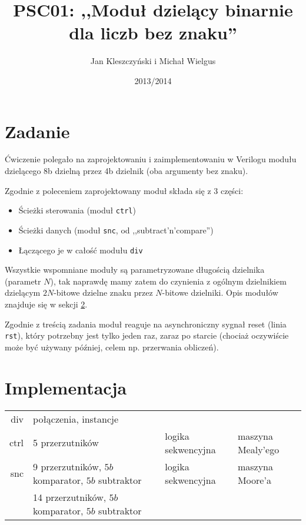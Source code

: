 \documentclass[a4paper]{article}
\author{Jan Kleszczyński i Michał Wielgus}
\title{PSC01: ,,Moduł dzielący binarnie dla liczb bez znaku''}
\date{2013/2014}
\begin{document}
\maketitle
\tableofcontents
\listoffigures
\listoftables
\clearpage
\setcounter{page}{1} 
\section{Zadanie}
Ćwiczenie polegało na zaprojektowaniu i zaimplementowaniu w Verilogu modułu dzielącego 8b dzielną przez 4b dzielnik (oba argumenty bez znaku).

Zgodnie z poleceniem zaprojektowany moduł składa się z 3 części:
\begin{itemize}
\item Ścieżki sterowania (moduł \texttt{ctrl})
\item Ścieżki danych (moduł \texttt{snc}, od ,,subtract'n'compare'')
\item Łączącego je w całość modułu \texttt{div}
\end{itemize}

Wszystkie wspomniane moduły są parametryzowane długością dzielnika (parametr $N$), tak naprawdę mamy zatem do czynienia z ogólnym dzielnikiem dzielącym $2N$-bitowe dzielne znaku przez $N$-bitowe dzielniki. Opis modułów znajduje się w sekcji \ref{sec:impl}.

Zgodnie z treścią zadania moduł reaguje na asynchroniczny sygnał reset (linia \texttt{rst}), który potrzebny jest tylko jeden raz, zaraz po starcie (chociaż oczywiście może być używany później, celem np. przerwania obliczeń).

\section{Implementacja} \label{sec:impl}
\begin{table}[!h]
	\centering
	\begin{tabular}{r|| l l l}
		div   &  połączenia, instancje                             &                    &                   \\
		ctrl  &  5 przerzutników                                   & logika sekwencyjna & maszyna Mealy'ego \\
		snc   &  9 przerzutników, $5b$ komparator, $5b$ subtraktor & logika sekwencyjna & maszyna Moore'a   \\
		\hline\hline
		      & 14 przerzutników, $5b$ komparator, $5b$ subtraktor &                    & \\
	\end{tabular}
\end{table}
\end{document}
